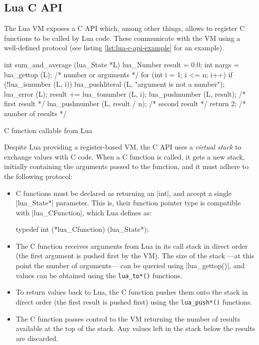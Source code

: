 \subsection{Lua C API}
	\label{sec:lua-c-api}

The Lua \gls{VM} exposes a C \gls{API} which, among other things, allows to
register C functions to be called by Lua code. These communicate with the VM
using a well-defined protocol (see listing \ref{lst:lua-c-api-example}
for an example).

\begin{listing}[H]
	\begin{ccode}
  int sum_and_average (lua_State *L) {
    lua_Number result = 0.0;
    int nargs = lua_gettop (L); /* number or arguments */
    for (int i = 1; i <= n; i++) {
      if (!lua_isnumber (L, i)) {
        lua_pushliteral (L, "argument is not a number");
        lua_error (L);
      }
      result += lua_tonumber (L, i);
    }
    lua_pushnumber (L, result);        /* first result */
    lua_pushnumber (L, result / n);   /* second result */
    return 2;                     /* number of results */
  }
	\end{ccode}
	\caption{C function callable from Lua}
	\label{lst:lua-c-api-example}
\end{listing}

Despite Lua providing a register-based VM, the C API uses a \emph{virtual
stack} to exchange values with C code. When a C function is called, it gets
a new stack, initially containing the arguments passed to the function, and
it must adhere to the following protocol:

\begin{itemize}
	\item C functions must be declared as returning an \Mc|int|, and accept
		a single \Mc|lua_State*| parameter. This is, their function pointer
		type is compatible with \Mc|lua_CFunction|, which Lua defines as:
		\begin{ccode}
			typedef int (*lua_Cfunction) (lua_State*);
		\end{ccode}

	\item The C function receives arguments from Lua in its call stack in
		direct order (the first argument is pushed first by the VM). The size of
		the stack —at this point the number of arguments— can be queried using
		\Mc|lua_gettop()|, and values can be obtained using the \verb|lua_to*()|
		functions.

	\item To return values back to Lua, the C function pushes them onto the
		stack in direct order (the first result is pushed first) using the
		\verb|lua_push*()| functions.

	\item The C function passes control to the VM returning the number of
		results available at the top of the stack. Any values left in the
		stack below the results are discarded.

\end{itemize}

